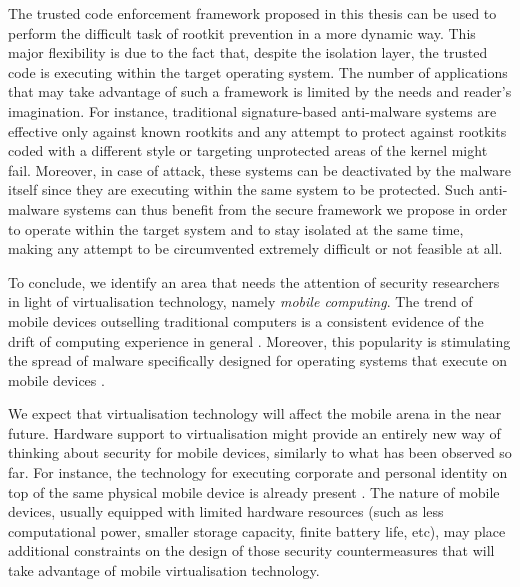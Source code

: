 The trusted code enforcement framework proposed in this thesis can be used to perform the difficult task of rootkit prevention in a more dynamic way. This major flexibility is due to the fact that, despite the isolation layer, the trusted code is executing within the target operating system. The number of applications that may take advantage of such a framework is limited by the needs and reader's imagination. For instance, traditional signature-based anti-malware systems are effective only against known rootkits \cite{Mahapatra:2011:OCV:1988997.1989022} and any attempt to protect against rootkits coded with a different style or targeting unprotected areas of the kernel might fail. Moreover, in case of attack, these systems can be deactivated by the malware itself since they are executing within the same system to be protected. Such anti-malware systems can thus benefit from the secure framework we propose in order to operate within the target system and to stay isolated at the same time, making any attempt to be circumvented extremely difficult or not feasible at all. 
 
To conclude, we identify an area that needs the attention of security researchers in light of virtualisation technology, namely \emph{mobile computing}. The trend of mobile devices outselling traditional computers is a consistent evidence of the drift of computing experience in general \cite{mobilemagic, oulasvirta:habits, 6072199}. Moreover, this popularity is stimulating the spread of malware specifically designed for operating systems that execute on  mobile devices \cite{mobilemalware, mobilemalware2, androidmalware, androidmalware2, iosmalware}.
  
We expect that virtualisation technology will affect the mobile arena in the near future. Hardware support to virtualisation might provide an entirely new way of thinking about security for mobile devices, similarly to what has been observed so far.
For instance, the technology for executing corporate and personal identity on top of the same physical mobile device is already present \cite{mobilevirt}. 
The nature of mobile devices, usually equipped with limited hardware resources (such as less computational power, smaller storage capacity, finite  battery life, etc), may place additional constraints on the design of those security countermeasures that will take advantage of mobile virtualisation technology. 


